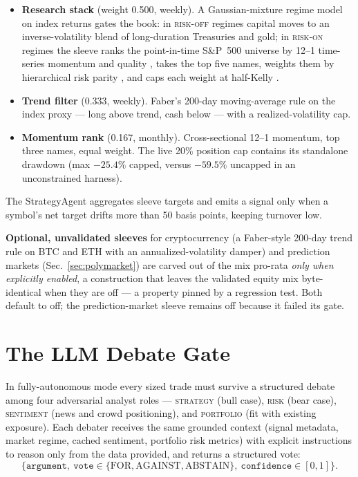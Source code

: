 \documentclass[10pt,twocolumn]{IEEEtran}
\begin{document}
\begin{itemize}
\item \textbf{Research stack} (weight 0.500, weekly). A Gaussian-mixture
regime model \cite{kritzman2012regime} on index returns gates the book:
in \textsc{risk-off} regimes capital moves to an inverse-volatility blend of
long-duration Treasuries and gold; in \textsc{risk-on} regimes the sleeve
ranks the point-in-time S\&P~500 universe by 12--1 time-series momentum
\cite{jegadeesh1993returns} and quality \cite{asness2019qmj}, takes the top
five names, weights them by hierarchical risk parity
\cite{lopezdeprado2016hrp}, and caps each weight at half-Kelly
\cite{kelly1956}.
\item \textbf{Trend filter} (0.333, weekly). Faber's 200-day moving-average
rule \cite{faber2007tactical} on the index proxy --- long above trend, cash
below --- with a realized-volatility cap.
\item \textbf{Momentum rank} (0.167, monthly). Cross-sectional 12--1
momentum, top three names, equal weight. The live 20\% position cap contains
its standalone drawdown (max $-25.4\%$ capped, versus $-59.5\%$ uncapped in
an unconstrained harness).
\end{itemize}

The StrategyAgent aggregates sleeve targets and emits a signal only when a
symbol's net target drifts more than 50 basis points, keeping turnover low.

\textbf{Optional, unvalidated sleeves} for cryptocurrency (a Faber-style
200-day trend rule on BTC and ETH with an annualized-volatility damper) and
prediction markets (Sec.~\ref{sec:polymarket}) are carved out of the mix
pro-rata \emph{only when explicitly enabled}, a construction that leaves the
validated equity mix byte-identical when they are off --- a property pinned
by a regression test. Both default to off; the prediction-market sleeve
remains off because it failed its gate.

\section{The LLM Debate Gate}
\label{sec:debate}

In fully-autonomous mode every sized trade must survive a structured debate
among four adversarial analyst roles --- \textsc{strategy} (bull case),
\textsc{risk} (bear case), \textsc{sentiment} (news and crowd positioning),
and \textsc{portfolio} (fit with existing exposure). Each debater receives
the same grounded context (signal metadata, market regime, cached sentiment,
portfolio risk metrics) with explicit instructions to reason only from the
data provided, and returns a structured vote:
\begin{equation*}
\{\texttt{argument},\ \texttt{vote} \in \{\text{FOR},
\text{AGAINST}, \text{ABSTAIN}\},\ \texttt{confidence} \in [0,1]\}.
\end{equation*}
\end{document}
